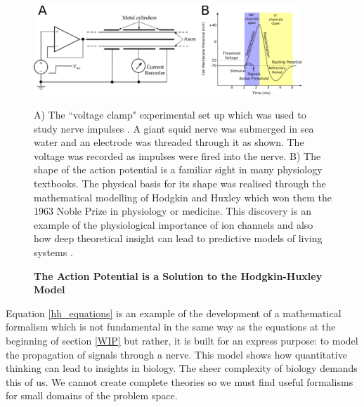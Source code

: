\begin{figure}
	\begin{center}
		\includegraphics[width=0.9\textwidth]{figures/Hodgkin-Huxley_action_potential.pdf}
	\end{center}
	\captionsetup{singlelinecheck = false, justification=raggedright}
	\caption[The Action Potential is a Solution to the Hodkin-Huxley Model] {\textbf{The Action Potential is a Solution to the Hodgkin-Huxley Model }}{ A) The ``voltage clamp" experimental set up which was used to study nerve impulses \cite{hodgkin_huxley_figure_website}. A giant squid nerve was submerged in sea water and an electrode was threaded through it as shown. The voltage was recorded as impulses were fired into the nerve. B) The shape of the action potential is a familiar sight in many physiology textbooks. The physical basis for its shape was realised through the mathematical modelling of Hodgkin and Huxley which won them the 1963 Noble Prize in physiology or medicine. This discovery is an example of the physiological importance of ion channels and also how deep theoretical insight can lead to predictive models of living systems \cite{hodgkin1952, hodgkin1952a, hodgkin1952b, hodgkin1952c, hodgkin1952d}.}
	\label{action_potential_graphic}
\end{figure}


Equation \ref{hh_equations} is an example of the development of a mathematical formalism which is not fundamental in the same way as the equations at the beginning of section \ref{WIP} but rather, it is built for an express purpose: to model the propagation of signals through a nerve. This model shows how quantitative thinking can lead to insights in biology. The sheer complexity of biology demands this of us. We cannot create complete theories so we must find useful formalisms for small domains of the problem space.

